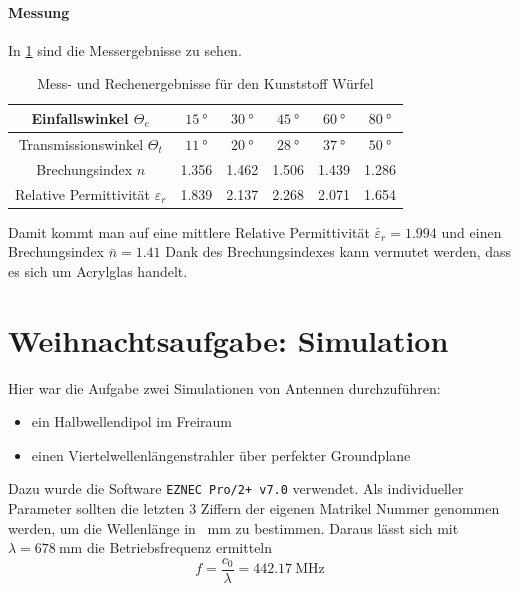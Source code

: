 \documentclass[colorlinks = true, allcolors = black, ngerman, 11pt,
a4paper, twoside, titlepage]{article}
\numberwithin{figure}{section}
\renewcommand{\si}[2]{\SI{#1}{#2}}
\begin{document}
	\paragraph{Messung}
	In \cref{tab:wurfel-messergebnisse} sind die Messergebnisse zu sehen.
	\begin{table} [h]
		\centering
		\begin{tabular}{|c|c|c|c|c|c|}
			\hline
			Einfallswinkel $\Theta_{e}$ & $\si{15}{\degree}$ &
			$\si{30}{\degree}$ & $\si{45}{\degree}$ & $\si{60}{\degree}$ &
			$\si{80}{\degree}$ \\
			\hline
			Transmissionswinkel $\Theta_{t}$ & $\si{11}{\degree}$ &
			$\si{20}{\degree}$ & $\si{28}{\degree}$ & $\si{37}{\degree}$ &
			$\si{50}{\degree}$ \\
			\hline
			Brechungsindex $n$ & 1.356 & 1.462 & 1.506 & 1.439 & 1.286 \\
			\hline
			Relative Permittivität $\varepsilon_{r}$ & 1.839 & 2.137 & 2.268 & 2.071 & 1.654 \\
			\hline
		\end{tabular}
		\caption{Mess- und Rechenergebnisse für den Kunststoff Würfel}
		\label{tab:wurfel-messergebnisse}
	\end{table}
	
	Damit kommt man auf eine mittlere Relative Permittivität $\bar{\varepsilon}_{r} = 1.994$ und einen Brechungsindex $\bar{n} = 1.41$
	Dank des Brechungsindexes kann vermutet werden, dass es sich um Acrylglas handelt.
	
	
	
	\section{Weihnachtsaufgabe: Simulation}
	Hier war die Aufgabe zwei Simulationen von Antennen durchzuführen:
	
	\begin{itemize}
		\item ein Halbwellendipol im Freiraum
		\item einen Viertelwellenlängenstrahler über perfekter Groundplane
	\end{itemize}
	
	Dazu wurde die Software \texttt{EZNEC Pro/2+ v7.0} verwendet. Als individueller Parameter sollten die letzten 3 Ziffern der eigenen Matrikel Nummer genommen werden, um die Wellenlänge in \si{}{\milli\meter} zu bestimmen.
	Daraus lässt sich mit $\lambda = \si{678}{\milli\meter}$ die Betriebsfrequenz ermitteln
	\begin{equation}
		f = \frac{c_{0}}{\lambda} = \si{442.17}{\mega\hertz}
	\end{equation}
	
\end{document}
